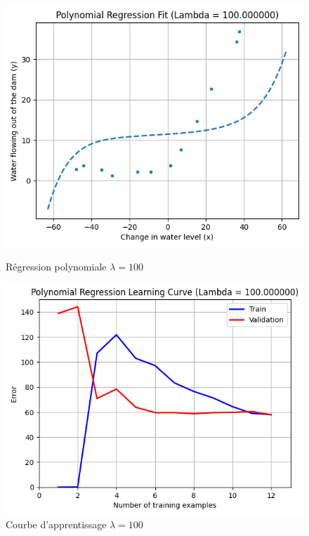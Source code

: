 \begin{figure}[!h]
    \begin{minipage}{.48\linewidth}
        \begin{center}
            \includegraphics[width=.8\textwidth]{./img/5.2(3).png}
            \caption{\label{fig:reg-poly-100}Régression polynomiale $\lambda = 100$}  
        \end{center}
    \end{minipage}\hfill
    \begin{minipage}{.48\linewidth}
        \begin{center}
            \includegraphics[width=.845\textwidth]{./img/5.2(4).png}
            \caption{\label{fig:learning-curve-poly-100}Courbe d'apprentissage $\lambda = 100$}  
        \end{center}
    \end{minipage}
\end{figure}

